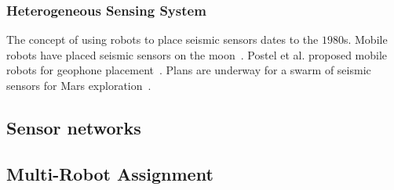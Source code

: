\subsubsection{Heterogeneous Sensing System}
The concept of using robots to place seismic sensors dates to the $1980$s. Mobile robots have placed seismic sensors on the moon~\cite{LSisMSE81}. Postel et al. proposed mobile robots for geophone placement~\cite{DSSMaA14}. Plans are underway for a swarm of seismic sensors for Mars exploration~\cite{MAPL2006}.


\subsection{Sensor networks}
\subsection{Multi-Robot Assignment}
